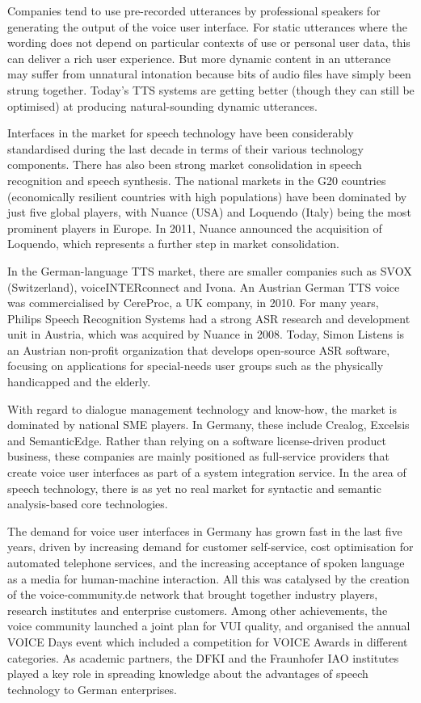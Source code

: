\documentclass[]{../metanetpaper}
\begin{document}
\begin{Parallel}[c]{80mm}{80mm}
{    Companies tend to use pre-recorded utterances by professional speakers for generating the output of the voice user interface. For static utterances where the wording does not depend on particular contexts of use or personal user data, this can deliver a rich user experience. But more dynamic content in an utterance may suffer from unnatural intonation because bits of audio files have simply been strung together. Today’s TTS systems are getting better (though they can still be optimised) at producing natural-sounding dynamic utterances. 

    Interfaces in the market for speech technology have been considerably standardised during the last decade in terms of their various technology components. There has also been strong market consolidation in speech recognition and speech synthesis. The national markets in the G20 countries (economically resilient countries with high populations) have been dominated by just five global players, with Nuance (USA) and Loquendo (Italy) being the most prominent players in Europe. In 2011, Nuance announced the acquisition of Loquendo, which represents a further step in market consolidation.

    In the German-language TTS market, there are smaller companies such as SVOX (Switzerland), voiceINTERconnect and Ivona. An Austrian German TTS voice was commercialised by CereProc, a UK company, in 2010. For many years, Philips Speech Recognition Systems had a strong ASR research and development unit in Austria, which was acquired by Nuance in 2008. Today, Simon Listens is an Austrian non-profit organization that develops open-source ASR software, focusing on applications for special-needs user groups such as the physically handicapped and the elderly.

    With regard to dialogue management technology and know-how, the market is dominated by national SME players. In Germany, these include Crealog, Excelsis and SemanticEdge. Rather than relying on a software license-driven product business, these companies are mainly positioned as full-service providers that create voice user interfaces as part of a system integration service. In the area of speech technology, there is as yet no real market for syntactic and semantic analysis-based core technologies.

    The demand for voice user interfaces in Germany has grown fast in the last five years, driven by increasing demand for customer self-service, cost optimisation for automated telephone services, and the increasing acceptance of spoken language as a media for human-machine interaction. All this was catalysed by the creation of the voice-community.de network that brought together industry players, research institutes and enterprise customers. Among other achievements, the voice community launched a joint plan for VUI quality, and organised the annual VOICE Days event which included a competition for VOICE Awards in different categories. As academic partners, the DFKI and the Fraunhofer IAO institutes played a key role in spreading knowledge about the advantages of speech technology to German enterprises.

}
\end{Parallel}
\end{document}
